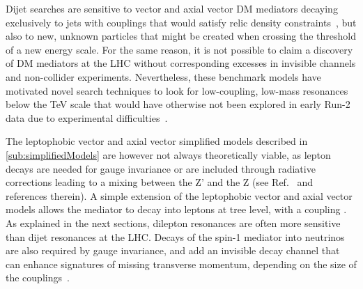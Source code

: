 
Dijet searches are sensitive to vector and axial vector DM mediators decaying 
exclusively to jets with couplings that would satisfy relic density constraints~\cite{Chala:2015ama},
but also to new, unknown particles that might be created when crossing 
the threshold of a new energy scale. For the same reason, 
it is not possible to claim a discovery of DM mediators at the LHC without
corresponding excesses in invisible channels and non-collider experiments. 
Nevertheless, these benchmark models have motivated novel search techniques
to look for low-coupling, low-mass resonances below the TeV scale that would
have otherwise not been explored in early Run-2 data due to experimental difficulties~\cite{An:2012ue,Dobrescu:2013coa}. 

The leptophobic vector and axial vector simplified models described in \ref{sub:simplifiedModels} 
are however not always theoretically viable, as lepton decays are needed for gauge invariance
or are included through radiative corrections leading to a mixing between the Z' and the Z 
(see Ref.~\cite{Albert:2017onk} and references therein). A simple extension of the leptophobic vector
and axial vector models allows the mediator to decay into leptons at tree level, with a coupling \gl. 
As explained in the next sections, dilepton resonances are often more sensitive than dijet resonances
at the LHC. Decays of the spin-1 mediator into neutrinos are also required by gauge invariance, and add 
an invisible decay channel that can enhance signatures of missing transverse momentum, depending on
the size of the couplings~\cite{Albert:2017onk}. 


